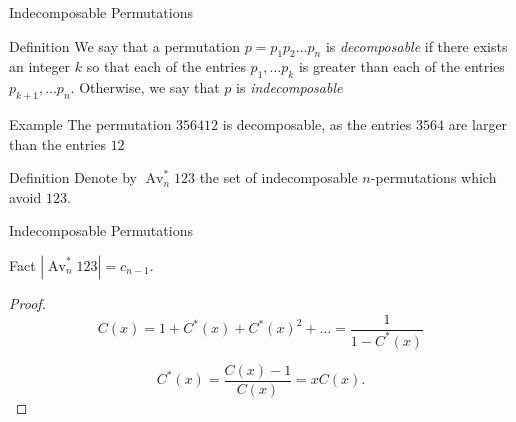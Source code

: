 \documentclass{beamer}
\DeclareMathOperator{\Av}{Av}
\newcommand{\Avns}{\Av_n ^* 123 }
\newcommand{\Avn}{\Av_n   123 }
\begin{document}
\begin{frame}{Indecomposable Permutations}
\pause
  
  \begin{block}{Definition}
    We say that a permutation $p = p_1 p_2 \ldots p_n$ is
    \emph{decomposable} if there exists an integer $k$ so that each
    of the entries $p_1, \ldots p_k$ is greater than each of the
    entries $p_{k+1}, \ldots p_n$. Otherwise, we say that $p$ is
    \emph{indecomposable}
  \end{block}

  \pause

  \begin{block}{Example}
    The permutation $3 5 6 4 1 2$ is decomposable, as the entries
    $3564$ are larger than the entries $12$
  \end{block}

  \pause

  \begin{block}{Definition}
    Denote by $\Avns$ the set of indecomposable $n$-permutations which
    avoid $123$.
  \end{block}

\end{frame}


\begin{frame}{Indecomposable Permutations}

  \begin{block}{Fact}
    $|\Avns| = c_{n-1}$.
  \end{block}
  \pause

  \begin{proof}
    \vspace{.5pc}


    \pause
    $$ C(x) = 1 + C^*(x) + C^*(x)^2 + \ldots = \frac{1}{1 - C^*(x)}$$

    \vspace{-1pc}
    \pause
    $$ C^*(x) = \frac{C(x) - 1}{C(x)} =  xC(x).$$


  \end{proof}

\end{frame}
\end{document}
